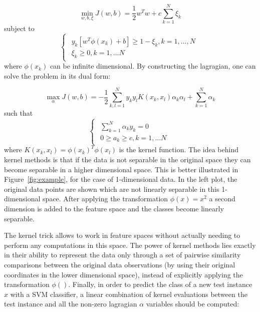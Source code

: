 \documentclass[conference,compsoc]{IEEEtran}
\begin{document}
\begin{equation}
\min\limits_{w,b,\xi} J(w,b) = \frac{1}{2}w^Tw + c \sum_{k=1}^{N}\xi_k
\end{equation}
subject to
\begin{equation*}
\begin{cases}
\begin{aligned}
  y_k[w^T\phi(x_k)+b] \geq 1-\xi_k, k=1,...,N \\
  \xi_k \geq 0, k =1,...N
\end{aligned}
\end{cases}
\end{equation*}
where $\phi(x_k)$ can be infinite dimensional. By constructing the lagragian, one can solve the problem in its dual form:


\begin{equation}
\max\limits_{\alpha} J(w,b) = -\frac{1}{2}\sum_{k,l=1}^{N}y_ky_lK(x_k,x_l)\alpha_k\alpha_l +  \sum_{k=1}^{N}\alpha_k
\end{equation}
such that
\begin{equation*}
\begin{cases}
\begin{aligned}
   \sum_{k=1}^{N}\alpha_ky_k=0 \\
  0 \geq a_k \geq c, k =1,...N
\end{aligned}
\end{cases}
\end{equation*}
where $K(x_k,x_l)=\phi(x_k)^T\phi(x_l)$ is the kernel function. The idea behind kernel methods is that if the data is not separable in the original space they can become separable in a higher dimensional space. This is better illustrated in Figure~\ref{fig:example}, for the case of 1-dimensional data. In the left plot, the original data points are shown which are not linearly separable in this 1-dimensional space. After applying the transformation $\phi(x)=x^2$ a second dimension is added to the feature space and the classes become linearly separable.

The kernel trick allows to work in feature spaces without actually needing to perform any computations in this space. The power of kernel methods lies exactly in their ability to represent the data only through a set of pairwise similarity comparisons between the original data observations (by using their original coordinates in the lower dimensional space), instead of explicitly applying the transformation $\phi()$. Finally, in order to predict the class of a new test instance $x$ with a SVM classifier, a linear combination of kernel evaluations between the test instance and all the non-zero lagragian $\alpha$ variables should be computed:
  
\end{document}
